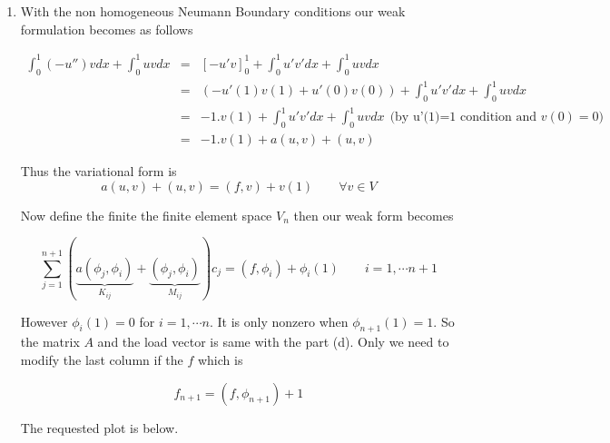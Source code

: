 {\begin{solution}
\begin{enumerate}
The above plot was produced using the following MATLAB code.



\item With the non homogeneous Neumann Boundary conditions our weak formulation becomes as follows

\begin{eqnarray*}
\int_0^1(-u'') v dx+ \int_0^1 u v dx &=& \left[-u' v\right]_0^1 + \int_0^1 u'v' dx + \int_0^1 u v dx \\
&=&\left(-u'(1) v(1) + u'(0)v(0)\right) + \int_0^1 u'v' dx +  \int_0^1u v dx \\
&=& -1 . v(1)+ \int_0^1 u'v' dx + \int_0^1 u v dx \:\: \mbox{(by u'(1)=1 condition and $v(0)=0$)} \\
&=& -1 . v(1)+ a(u,v)+ (u,v)
\end{eqnarray*}

Thus the variational form is
\[ a(u,v)+ (u,v)  = (f,v) + v(1) \qquad \forall v \in V\]

Now define the finite the finite element space $V_n$ then our weak form becomes 

\[ \sum_{j=1}^{n+1}\left( \underbrace{a( \phi_j, \phi_i)}_{K_{ij}} + \underbrace{(\phi_j, \phi_i)}_{M_{ij}}\right) c_j   = (f,\phi_i) + \phi_i(1) \qquad  i=1, \cdots n+1\]

However $\phi_i(1)=0$ for $i=1, \cdots n$. It is only nonzero when $\phi_{n+1}(1)=1$. So the matrix $A$ and the load vector is same with the part (d). Only we need to modify the last column if the $f$ which is

\[
f_{n+1}=(f,\phi_{n+1})+1
\]

The requested plot is below.


\end{enumerate}
\end{solution}}
